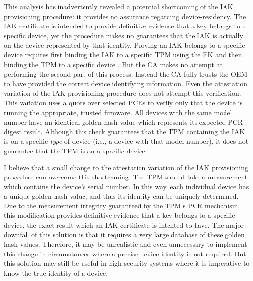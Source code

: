 This analysis has inadvertently revealed a potential shortcoming of the IAK provisioning procedure: it provides no assurance regarding device-residency.
The IAK certificate is intended to provide definitive evidence that a key belongs to a specific device, yet the procedure makes no guarantees that the IAK is actually on the device represented by that identity.
Proving an IAK belongs to a specific device requires first binding the IAK to a specific TPM using the EK and then binding the TPM to a specific device \cite{DevIDSpec-TCG}. 
But the CA makes no attempt at performing the second part of this process. Instead the CA fully trusts the OEM to have provided the correct device identifying information. 
Even the attestation variation of the IAK provisioning procedure does not attempt this verification. This variation uses a quote over selected PCRs to verify only that the device is running the appropriate, trusted firmware. All devices with the same model number have an identical golden hash value which represents its expected PCR digest result.
Although this check guarantees that the TPM containing the IAK is on a specific \textit{type} of device (i.e., a device with that model number), it does not guarantee that the TPM is on a specific device. 

I believe that a small change to the attestation variation of the IAK provisioning procedure can overcome this shortcoming. The TPM should take a measurement which contains the device's serial number. In this way. each individual device has a unique golden hash value, and thus its identity can be uniquely determined.
Due to the measurement integrity guaranteed by the TPM's PCR mechanism, this modification provides definitive evidence that a key belongs to a specific 
device, the exact result which an IAK certificate is intented to have.
The major downfall of this solution is that it requires a very large database of these golden hash values. Therefore, it may be unrealistic and even unnecessary to implement this change in circumstances where a precise device identity is not required.
But this solution may still be useful in high security systems where it is imperative to know the true identity of a device.



